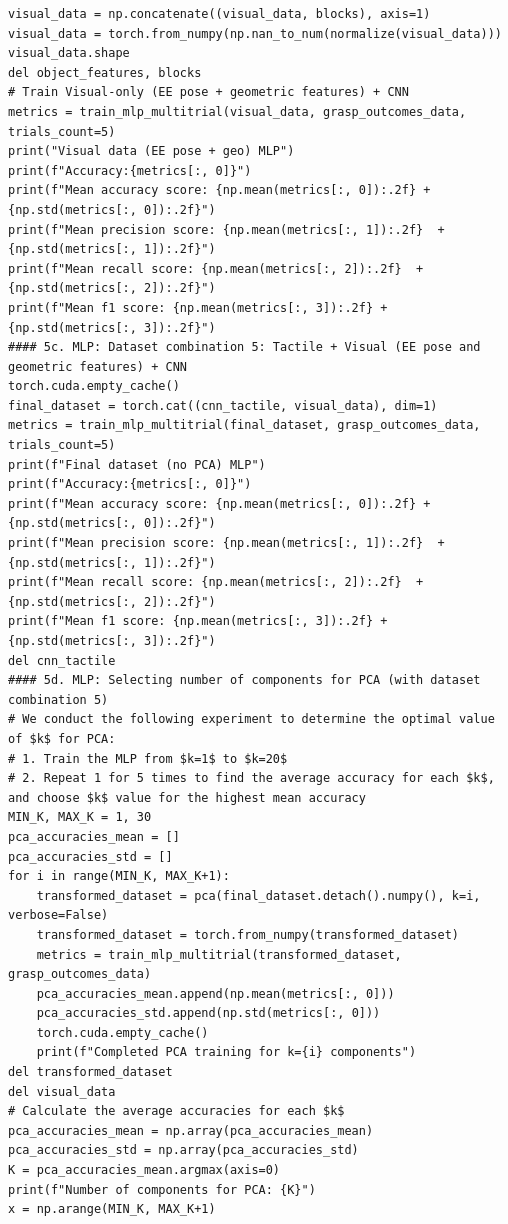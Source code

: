 \documentclass[11pt, a4paper]{report}
\begin{document}
\begin{lstlisting}
visual_data = np.concatenate((visual_data, blocks), axis=1)
visual_data = torch.from_numpy(np.nan_to_num(normalize(visual_data)))
visual_data.shape
del object_features, blocks
# Train Visual-only (EE pose + geometric features) + CNN
metrics = train_mlp_multitrial(visual_data, grasp_outcomes_data, trials_count=5)
print("Visual data (EE pose + geo) MLP")
print(f"Accuracy:{metrics[:, 0]}")
print(f"Mean accuracy score: {np.mean(metrics[:, 0]):.2f} + {np.std(metrics[:, 0]):.2f}")
print(f"Mean precision score: {np.mean(metrics[:, 1]):.2f}  + {np.std(metrics[:, 1]):.2f}")
print(f"Mean recall score: {np.mean(metrics[:, 2]):.2f}  + {np.std(metrics[:, 2]):.2f}")
print(f"Mean f1 score: {np.mean(metrics[:, 3]):.2f} + {np.std(metrics[:, 3]):.2f}")
#### 5c. MLP: Dataset combination 5: Tactile + Visual (EE pose and geometric features) + CNN
torch.cuda.empty_cache()
final_dataset = torch.cat((cnn_tactile, visual_data), dim=1)
metrics = train_mlp_multitrial(final_dataset, grasp_outcomes_data, trials_count=5)
print(f"Final dataset (no PCA) MLP")
print(f"Accuracy:{metrics[:, 0]}")
print(f"Mean accuracy score: {np.mean(metrics[:, 0]):.2f} + {np.std(metrics[:, 0]):.2f}")
print(f"Mean precision score: {np.mean(metrics[:, 1]):.2f}  + {np.std(metrics[:, 1]):.2f}")
print(f"Mean recall score: {np.mean(metrics[:, 2]):.2f}  + {np.std(metrics[:, 2]):.2f}")
print(f"Mean f1 score: {np.mean(metrics[:, 3]):.2f} + {np.std(metrics[:, 3]):.2f}")
del cnn_tactile
#### 5d. MLP: Selecting number of components for PCA (with dataset combination 5)
# We conduct the following experiment to determine the optimal value of $k$ for PCA:
# 1. Train the MLP from $k=1$ to $k=20$
# 2. Repeat 1 for 5 times to find the average accuracy for each $k$, and choose $k$ value for the highest mean accuracy
MIN_K, MAX_K = 1, 30
pca_accuracies_mean = []
pca_accuracies_std = []
for i in range(MIN_K, MAX_K+1):
    transformed_dataset = pca(final_dataset.detach().numpy(), k=i, verbose=False)
    transformed_dataset = torch.from_numpy(transformed_dataset)
    metrics = train_mlp_multitrial(transformed_dataset, grasp_outcomes_data)
    pca_accuracies_mean.append(np.mean(metrics[:, 0]))
    pca_accuracies_std.append(np.std(metrics[:, 0]))
    torch.cuda.empty_cache()
    print(f"Completed PCA training for k={i} components")
del transformed_dataset
del visual_data
# Calculate the average accuracies for each $k$
pca_accuracies_mean = np.array(pca_accuracies_mean)
pca_accuracies_std = np.array(pca_accuracies_std)
K = pca_accuracies_mean.argmax(axis=0)
print(f"Number of components for PCA: {K}")
x = np.arange(MIN_K, MAX_K+1)

\end{lstlisting}
\end{document}
